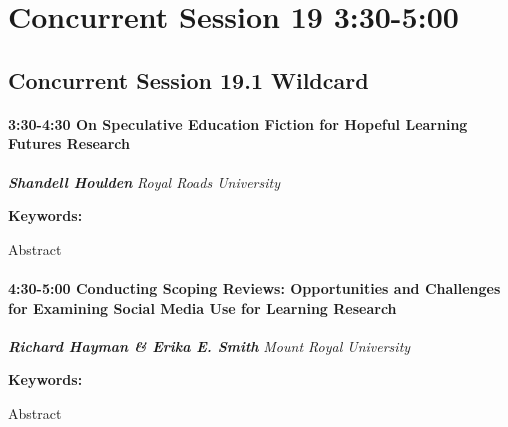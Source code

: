 \documentclass[
]{book}
\begin{document}
\hypertarget{concurrent-session-19-330-500}{%
\section*{Concurrent Session 19 \textbar{} 3:30-5:00}\label{concurrent-session-19-330-500}}

\hypertarget{concurrent-session-19.1-wildcard}{%
\subsection*{Concurrent Session 19.1 \textbar{} Wildcard}\label{concurrent-session-19.1-wildcard}}

\begin{session}
\hypertarget{on-speculative-education-fiction-for-hopeful-learning-futures-research}{%
\paragraph*{\texorpdfstring{3:30-4:30 \textbar{} \textbf{On Speculative
Education Fiction for Hopeful Learning Futures} \textbar{}
Research}{3:30-4:30 \textbar{} On Speculative Education Fiction for Hopeful Learning Futures \textbar{} Research}}\label{on-speculative-education-fiction-for-hopeful-learning-futures-research}}

\textbf{\emph{Shandell Houlden}} \textbar{} \emph{Royal Roads
University}

\textbf{Keywords:}

Abstract
\end{session}

\begin{session}
\hypertarget{conducting-scoping-reviews-opportunities-and-challenges-for-examining-social-media-use-for-learning-research}{%
\paragraph*{\texorpdfstring{4:30-5:00 \textbar{} \textbf{Conducting
Scoping Reviews: Opportunities and Challenges for Examining Social Media
Use for Learning} \textbar{}
Research}{4:30-5:00 \textbar{} Conducting Scoping Reviews: Opportunities and Challenges for Examining Social Media Use for Learning \textbar{} Research}}\label{conducting-scoping-reviews-opportunities-and-challenges-for-examining-social-media-use-for-learning-research}}

\textbf{\emph{Richard Hayman \& Erika E. Smith}} \textbar{} \emph{Mount
Royal University}

\textbf{Keywords:}

Abstract
\end{session}
\end{document}

